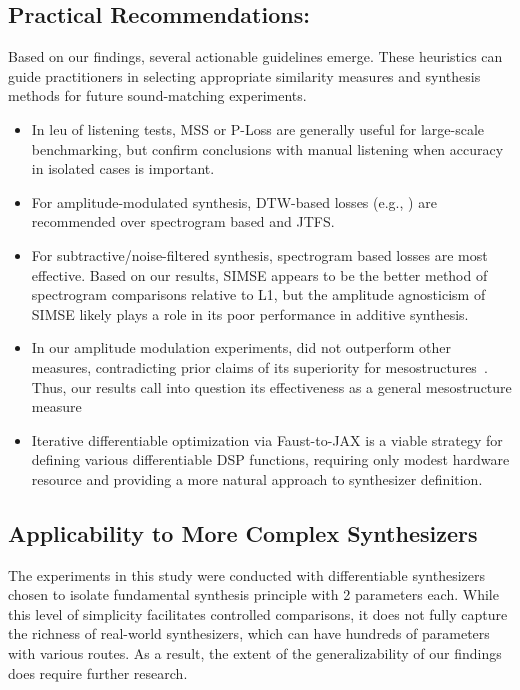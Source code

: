 \subsection{Practical Recommendations:}
Based on our findings, several actionable guidelines emerge. These heuristics can guide practitioners in selecting appropriate similarity measures and synthesis methods for future sound-matching experiments.
\begin{itemize}
    \item In leu of listening tests, MSS or P-Loss are generally useful for large-scale benchmarking, but confirm conclusions with manual listening when accuracy in isolated cases is important. 
    \item For amplitude-modulated synthesis, DTW-based losses (e.g., \DTWEnv{}) are recommended over spectrogram based and JTFS. 
    \item For subtractive/noise-filtered synthesis, spectrogram based losses are most effective. Based on our results, SIMSE appears to be the better method of spectrogram comparisons relative to L1, but the amplitude agnosticism of SIMSE likely plays a role in its poor performance in additive synthesis.  
    \item In our amplitude modulation experiments, \JTFS{} did not outperform other measures, contradicting prior claims of its superiority for mesostructures~\cite{vahidi2023mesostructures}. Thus, our results call into question its effectiveness as a general mesostructure measure
    \item Iterative differentiable optimization via Faust-to-JAX is a viable strategy for defining various differentiable DSP functions, requiring only modest hardware resource and providing a more natural approach to synthesizer definition.
\end{itemize}

\subsection{Applicability to More Complex Synthesizers}
The experiments in this study were conducted with differentiable synthesizers chosen to isolate fundamental synthesis principle with 2 parameters each. While this level of simplicity facilitates controlled comparisons, it does not fully capture the richness of real-world synthesizers, which can have hundreds of parameters with various routes. As a result, the extent of the generalizability of our findings does require further research. 

